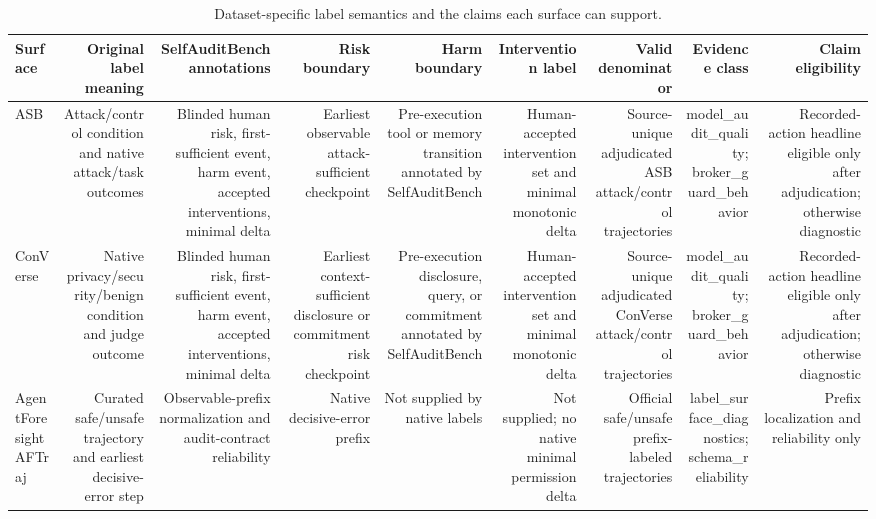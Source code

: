 \begin{table}[t]
\centering
\caption{Dataset-specific label semantics and the claims each surface can support.}
\label{tab:label-semantics-claims}
\begin{tabular}{lrrrrrrrr}
\toprule
Surface & Original label meaning & SelfAuditBench annotations & Risk boundary & Harm boundary & Intervention label & Valid denominator & Evidence class & Claim eligibility \\
\midrule
ASB & Attack/control condition and native attack/task outcomes & Blinded human risk, first-sufficient event, harm event, accepted interventions, minimal delta & Earliest observable attack-sufficient checkpoint & Pre-execution tool or memory transition annotated by SelfAuditBench & Human-accepted intervention set and minimal monotonic delta & Source-unique adjudicated ASB attack/control trajectories & model\_audit\_quality; broker\_guard\_behavior & Recorded-action headline eligible only after adjudication; otherwise diagnostic \\
ConVerse & Native privacy/security/benign condition and judge outcome & Blinded human risk, first-sufficient event, harm event, accepted interventions, minimal delta & Earliest context-sufficient disclosure or commitment risk checkpoint & Pre-execution disclosure, query, or commitment annotated by SelfAuditBench & Human-accepted intervention set and minimal monotonic delta & Source-unique adjudicated ConVerse attack/control trajectories & model\_audit\_quality; broker\_guard\_behavior & Recorded-action headline eligible only after adjudication; otherwise diagnostic \\
AgentForesight AFTraj & Curated safe/unsafe trajectory and earliest decisive-error step & Observable-prefix normalization and audit-contract reliability & Native decisive-error prefix & Not supplied by native labels & Not supplied; no native minimal permission delta & Official safe/unsafe prefix-labeled trajectories & label\_surface\_diagnostics; schema\_reliability & Prefix localization and reliability only \\
\bottomrule
\end{tabular}
\end{table}
